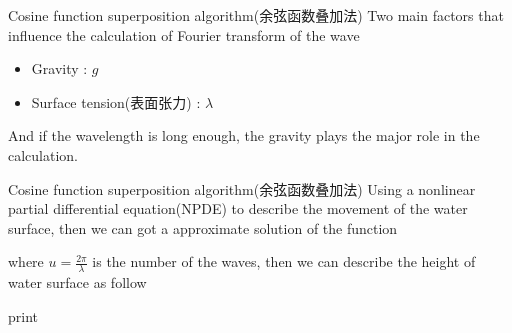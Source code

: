 \documentclass{beamer}
\begin{document}
\begin{frame}{Cosine function superposition algorithm(余弦函数叠加法)}
  Two main factors that influence the calculation of Fourier transform of the wave
    \begin{itemize}
      \item Gravity : $g$
      \item Surface tension(表面张力) : $\lambda$
    \end{itemize}
  And if the wavelength is long enough, the gravity plays the major role in the calculation.
\end{frame}
\begin{frame}{Cosine function superposition algorithm(余弦函数叠加法)}
  Using a nonlinear partial differential equation(NPDE) to describe the movement of the water surface, then we can got a approximate solution of the function
  \begin{figure}[thpb]
    \centering
  \label{fig:system}
  \end{figure}
  where $u=\frac{2\pi}{\lambda}$ is the number of the waves, then we can describe the height of water surface as follow
  \begin{figure}[thpb]
    \centering
  \label{fig:system}
  \end{figure}
  print
\end{frame}
\end{document}
